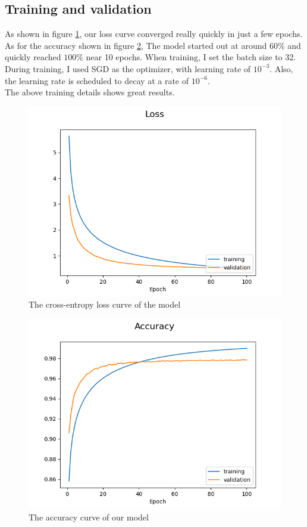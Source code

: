 \documentclass[a4paper, 10]{article}
\begin{document}
    \subsection{Training and validation}
            As shown in figure \ref{fig:2}, our loss curve converged
            really quickly in just a few epochs. As for the accuracy
            shown in figure \ref{fig:3}, The model started out at around
            $60\%$ and quickly reached $100\%$ near 10 epochs. When training, 
            I set the batch size to 32. During training, I used SGD as the 
            optimizer, with learning rate of $10^{-3}$. Also, the learning 
            rate is scheduled to decay at a rate of $10^{-6}$. \\
            The above training details shows great results.
    \begin{figure}[H]
        \centering
        \includegraphics[scale=0.7]{Loss.png}
        \caption{The cross-entropy loss curve of the model} \label{fig:2}
    \end{figure}
    \begin{figure}[H]
        \centering
        \includegraphics[scale=0.7]{Accuracy.png}
        \caption{The accuracy curve of our model} \label{fig:3}
    \end{figure}
\end{document}
